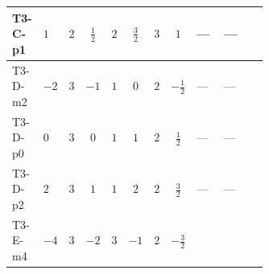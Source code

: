\documentclass[8pt]{article}
\begin{document}
\begin{landscape}
\begin{longtable}{@{}llcccccc >{\raggedright\arraybackslash}p{0.21\linewidth} >{\raggedright\arraybackslash}p{0.21\linewidth} >{\raggedright\arraybackslash}p{0.21\linewidth}@{}}
\midrule
T3-C-p1 & $1$ & $2$ & $\frac{1}{2}$ & $2$ & $\frac{3}{2}$ & $3$ & $1$ & --- & --- & \scriptsize\adjustbox{max width=\linewidth}{$\begin{gathered} -5 \operatorname{Tr}\!\left({y_2}\,\left({y_2}\right)^{\dagger}\,{y_2}\,\left({y_2}\right)^{\dagger}\right)\end{gathered}$} \\
\midrule
T3-D-m2 & $-2$ & $3$ & $-1$ & $1$ & $0$ & $2$ & $-\frac{1}{2}$ & --- & --- & \scriptsize\adjustbox{max width=\linewidth}{$\begin{gathered} -8 \operatorname{Tr}\!\left({y_2}\,\left({y_2}\right)^{\dagger}\,{y_2}\,\left({y_2}\right)^{\dagger}\right)\end{gathered}$} \\
\midrule
T3-D-p0 & $0$ & $3$ & $0$ & $1$ & $1$ & $2$ & $\frac{1}{2}$ & --- & --- & \scriptsize\adjustbox{max width=\linewidth}{$\begin{gathered} -8 \operatorname{Tr}\!\left({y_2}\,\left({y_2}\right)^{\dagger}\,{y_2}\,\left({y_2}\right)^{\dagger}\right)\end{gathered}$} \\
\midrule
T3-D-p2 & $2$ & $3$ & $1$ & $1$ & $2$ & $2$ & $\frac{3}{2}$ & --- & --- & \scriptsize\adjustbox{max width=\linewidth}{$\begin{gathered} -8 \operatorname{Tr}\!\left({y_2}\,\left({y_2}\right)^{\dagger}\,{y_2}\,\left({y_2}\right)^{\dagger}\right)\end{gathered}$} \\
\midrule
T3-E-m4 & $-4$ & $3$ & $-2$ & $3$ & $-1$ & $2$ & $-\frac{3}{2}$ & \scriptsize\adjustbox{max width=\linewidth}{$\begin{gathered} {\lambda_{S_2}^{(1)}} (4 T_{\nu}^{(2)}+14 {\lambda_{S_2}^{(A)}})\end{gathered}$} & \scriptsize\adjustbox{max width=\linewidth}{$\begin{gathered} +2 {\lambda_{S_2}^{(A)}} T_{\nu}^{(2)}\end{gathered}$} & \scriptsize\adjustbox{max width=\linewidth}{$\begin{gathered} -3 \operatorname{Tr}\!\left({y_2}\,\left({y_2}\right)^{\dagger}\,{y_2}\,\left({y_2}\right)^{\dagger}\right)\end{gathered}$} \\
\midrule

\end{longtable}
\end{landscape}
\end{document}
